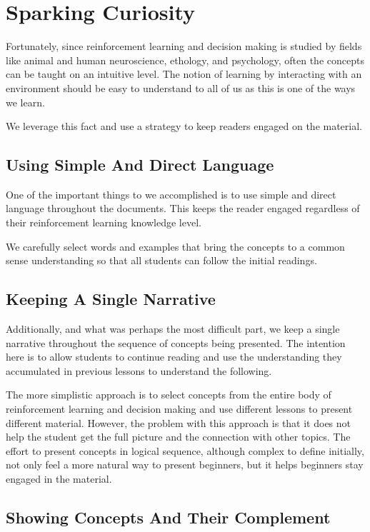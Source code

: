 \documentclass[11pt]{article} %
\begin{document}
\section{Sparking Curiosity}

Fortunately, since reinforcement learning and decision making is studied
by fields like animal and human neuroscience, ethology, and psychology, often
the concepts can be taught on an intuitive level. The notion of learning
by interacting with an environment should be easy to understand to all of
us as this is one of the ways we learn.

We leverage this fact and use a strategy to keep readers engaged on the
material.

\subsection{Using Simple And Direct Language}

One of the important things to we accomplished is to use simple and direct
language throughout the documents. This keeps the reader engaged regardless
of their reinforcement learning knowledge level.

We carefully select words and examples that bring the concepts to a
common sense understanding so that all students can follow the initial
readings.

\subsection{Keeping A Single Narrative}

Additionally, and what was perhaps the most difficult part, we keep a single
narrative throughout the sequence of concepts being presented. The intention
here is to allow students to continue reading and use the understanding they
accumulated in previous lessons to understand the following.

The more simplistic approach is to select concepts from the entire body of
reinforcement learning and decision making and use different lessons to present
different material. However, the problem with this approach is that it does
not help the student get the full picture and the connection with other topics.
The effort to present concepts in logical sequence, although complex to define
initially, not only feel a more natural way to present beginners, but it helps
beginners stay engaged in the material.

\subsection{Showing Concepts And Their Complement}
\end{document}
